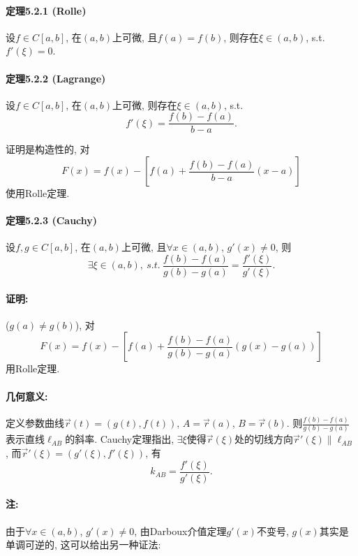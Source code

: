 \paragraph{定理5.2.1 (Rolle)}

设$f\in C[a,b]$, 在$(a,b)$上可微, 且$f(a)=f(b)$, 则存在$\xi\in(a,b)$, s.t.
$f'(\xi)=0$.

\paragraph{定理5.2.2 (Lagrange)}

设$f\in C[a,b]$, 在$(a,b)$上可微, 则存在$\xi\in(a,b)$, s.t.
\[
f'(\xi)=\frac{f(b)-f(a)}{b-a}.
\]

证明是构造性的, 对
\[
F(x)=f(x)-\left[f(a)+\frac{f(b)-f(a)}{b-a}(x-a)\right]
\]
使用Rolle定理.

\paragraph{定理5.2.3 (Cauchy)}

设$f,g\in C[a,b]$, 在$(a,b)$上可微, 且$\forall x\in(a,b)$, $g'(x)\ne0$,
则
\[
\exists\xi\in(a,b),\ s.t.\ \frac{f(b)-f(a)}{g(b)-g(a)}=\frac{f'(\xi)}{g'(\xi)}.
\]


\paragraph{证明:}

($g(a)\ne g(b)$), 对
\[
F(x)=f(x)-\left[f(a)+\frac{f(b)-f(a)}{g(b)-g(a)}(g(x)-g(a))\right]
\]
用Rolle定理.

\paragraph{几何意义:}

定义参数曲线$\overrightarrow{r}(t)=(g(t),f(t))$, $A=\overrightarrow{r}(a)$,
$B=\overrightarrow{r}(b)$. 则$\frac{f(b)-f(a)}{g(b)-g(a)}$表示直线$\ell_{AB}$的斜率.
Cauchy定理指出, $\exists\xi$使得$\overrightarrow{r}(\xi)$处的切线方向$\overrightarrow{r}'(\xi)\parallel\ell_{AB}$,
而$\overrightarrow{r}'(\xi)=(g'(\xi),f'(\xi))$, 有
\[
k_{AB}=\frac{f'(\xi)}{g'(\xi)}.
\]


\paragraph{注:}

由于$\forall x\in(a,b)$, $g'(x)\ne0$, 由Darboux介值定理$g'(x)$不变号, $g(x)$其实是单调可逆的,
这可以给出另一种证法:

